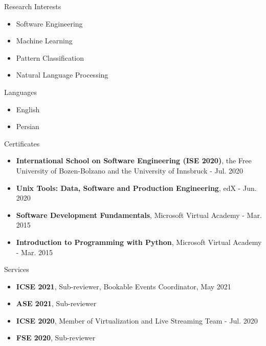 \documentclass{resume} %
\begin{document}
\begin{paracol}{2}
\begin{rSection}{Research Interests}
	
	\begin{itemize}
		\item Software Engineering
		\item Machine Learning
		\item Pattern Classification
		\item Natural Language Processing
	\end{itemize}
	
\end{rSection}
\switchcolumn
\begin{rSection}{Languages}
	
	\begin{itemize}
		\item English
		\item Persian 
	\end{itemize}
	
\end{rSection}
\end{paracol}

\begin{rSection}{Certificates}
	
	\begin{itemize}
		\item \textbf{International School on Software Engineering (ISE 2020)}, the Free University of Bozen-Bolzano
         and the University of Innsbruck - Jul. 2020
		\item \textbf{Unix Tools: Data, Software and Production Engineering}, edX - Jun. 2020
		\item \textbf{Software Development Fundamentals}, Microsoft Virtual Academy - Mar. 2015
		\item \textbf{Introduction to Programming with Python}, Microsoft Virtual Academy - Mar. 2015
	\end{itemize}
	
\end{rSection}

\begin{rSection}{Services}
	
	\begin{itemize}
		\item \textbf{ICSE 2021}, Sub-reviewer, Bookable Events Coordinator, May 2021
		\item \textbf{ASE 2021}, Sub-reviewer
		\item \textbf{ICSE 2020}, Member of Virtualization and Live Streaming Team - Jul. 2020
		\item \textbf{FSE 2020}, Sub-reviewer
	\end{itemize}
	
\end{rSection}
\end{document}
